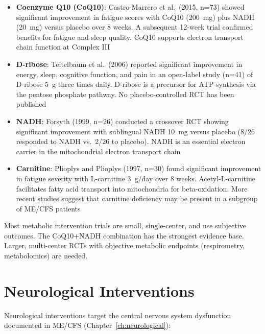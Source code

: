 \begin{itemize}
    \item \textbf{Coenzyme Q10 (CoQ10)}: Castro-Marrero et al.\ (2015, n=73) showed significant improvement in fatigue scores with CoQ10 (200~mg) plus NADH (20~mg) versus placebo over 8 weeks. A subsequent 12-week trial confirmed benefits for fatigue and sleep quality. CoQ10 supports electron transport chain function at Complex III
    \item \textbf{D-ribose}: Teitelbaum et al.\ (2006) reported significant improvement in energy, sleep, cognitive function, and pain in an open-label study (n=41) of D-ribose 5~g three times daily. D-ribose is a precursor for ATP synthesis via the pentose phosphate pathway. No placebo-controlled RCT has been published
    \item \textbf{NADH}: Forsyth (1999, n=26) conducted a crossover RCT showing significant improvement with sublingual NADH 10~mg versus placebo (8/26 responded to NADH vs.\ 2/26 to placebo). NADH is an essential electron carrier in the mitochondrial electron transport chain
    \item \textbf{Carnitine}: Plioplys and Plioplys (1997, n=30) found significant improvement in fatigue severity with L-carnitine 3~g/day over 8 weeks. Acetyl-L-carnitine facilitates fatty acid transport into mitochondria for beta-oxidation. More recent studies suggest that carnitine deficiency may be present in a subgroup of ME/CFS patients
\end{itemize}

\begin{limitation}
Most metabolic intervention trials are small, single-center, and use subjective outcomes. The CoQ10+NADH combination has the strongest evidence base. Larger, multi-center RCTs with objective metabolic endpoints (respirometry, metabolomics) are needed.
\end{limitation}

\section{Neurological Interventions}
\label{sec:trials-neurological}

Neurological interventions target the central nervous system dysfunction documented in ME/CFS (Chapter~\ref{ch:neurological}):

